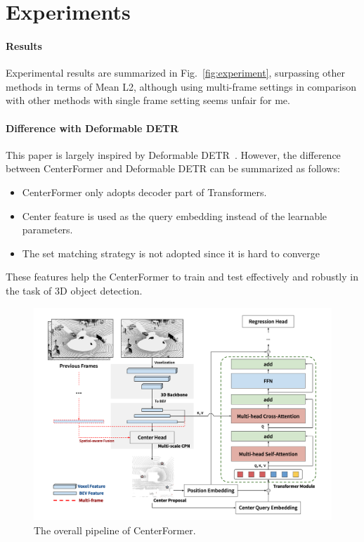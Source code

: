 \documentclass[10pt,twocolumn,letterpaper]{article}
\begin{document}
\section{Experiments}

\paragraph{Results}
Experimental results are summarized in Fig.~\ref{fig:experiment}, surpassing other methods in terms of Mean L2, although using multi-frame settings in comparison with other methods with single frame setting seems unfair for me.

\paragraph{Difference with Deformable DETR}
This paper is largely inspired by Deformable DETR~\cite{deformabledetr}. However, the difference between CenterFormer and Deformable DETR can be summarized as follows:
\begin{itemize}
\item CenterFormer only adopts decoder part of Transformers.
\item Center feature is used as the query embedding instead of the learnable parameters.
\item The set matching strategy is not adopted since it is hard to converge~\cite{yin2021center}
\end{itemize}
These features help the CenterFormer to train and test effectively and robustly in the task of 3D object detection.



\begin{figure}[t]
    \includegraphics[width=\linewidth]{assets/centerformer.png}
    \caption{\label{fig:overview}The overall pipeline of CenterFormer.}
\end{figure}
\end{document}
